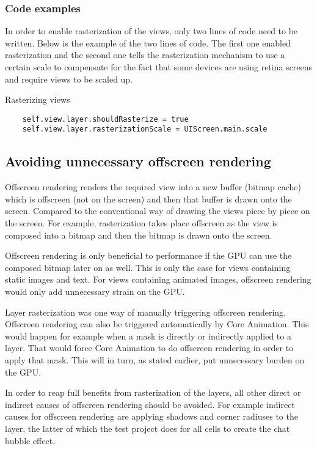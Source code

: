 \documentclass[a4paper,12pt]{article}
\begin{document}
\subsubsection*{Code examples}
In order to enable rasterization of the views, only two lines of code need to be written. Below is the example of the two lines of code. The first one enabled rasterization and the second one tells the rasterization mechanism to use a certain scale to compensate for the fact that some devices are using retina screens and require views to be scaled up.
\begin{listing}[H]
  \caption{Rasterizing views}
  \begin{verbatim}
    self.view.layer.shouldRasterize = true
    self.view.layer.rasterizationScale = UIScreen.main.scale
  \end{verbatim}
\end{listing}

\subsection{Avoiding unnecessary offscreen rendering}
Offscreen rendering renders the required view into a new buffer (bitmap cache) which is offscreen (not on the screen) and then that buffer is drawn onto the screen. Compared to the conventional way of drawing the views piece by piece on the screen. For example, rasterization takes place offscreen as the view is composed into a bitmap and then the bitmap is drawn onto the screen.

Offscreen rendering is only beneficial to performance if the GPU can use the composed bitmap later on as well. This is only the case for  views containing static images and text. For views containing animated images, offscreen rendering would only add unnecessary strain on the GPU.

Layer rasterization was one way of manually triggering offscreen rendering. Offscreen rendering can also be triggered automatically by Core Animation. This would happen for example when a mask is directly or indirectly applied to a layer. That would force Core Animation to do offscreen rendering in order to apply that mask. This will in turn, as stated earlier, put unnecessary burden on the GPU.\cite{MovingPixelsOntoTheScreen}

In order to reap full benefits from rasterization of the layers, all other direct or indirect causes of offscreen rendering should be avoided. For example indirect causes for offscreen rendering are applying shadows and corner radiuses to the layer, the latter of which the test project does for all cells to create the chat bubble effect.\cite{MovingPixelsOntoTheScreen}
\end{document}
